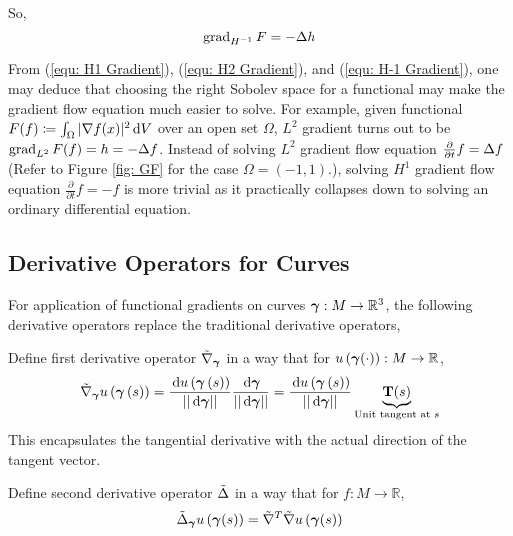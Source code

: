 \documentclass[../dissertation.tex]{subfiles}
\begin{document}
So,
\begin{equation}
    \operatorname{grad}_{H^{-1}} F = -\Delta h
    \label{equ: H-1 Gradient}
\end{equation}
\begin{remark}
    From (\ref{equ: H1 Gradient}), (\ref{equ: H2 Gradient}), and (\ref{equ: H-1 Gradient}), one may deduce that
    choosing the right Sobolev space for a functional may make the gradient flow equation much easier to solve.
    For example, given functional $F (f) \coloneqq \int_{\Omega} |\nabla f (x)|^2 \, \text{d} V$ over an open set $\Omega$,
    $L^2$ gradient turns out to be $\operatorname{grad}_{L^2} F (f) = h = -\Delta f$. 
    Instead of solving $L^2$ gradient flow equation $\frac{\partial}{\partial t} f = \Delta f$ (Refer to Figure \ref{fig: GF} for the case $\Omega = (-1, 1)$.),
    solving $H^1$ gradient flow equation $\frac{\partial}{\partial t}f = -f$ is more trivial
    as it practically collapses down to solving an ordinary differential equation.
\end{remark}

\subsection{Derivative Operators for Curves}
For application of functional gradients on curves $\boldsymbol{\gamma}: M \rightarrow \mathbb{R}^3$,
the following derivative operators replace the traditional derivative operators,
\begin{definition}
    Define first derivative operator\cite{YSC2021} $\tilde{\nabla}_{\boldsymbol{\gamma}}$ in a way that for $u \left( \boldsymbol{\gamma} (\cdot) \right): M \rightarrow \mathbb{R}$,
    \begin{equation}
        \tilde{\nabla}_{\boldsymbol{\gamma}} u \left( \boldsymbol{\gamma} \left( s \right) \right)
        = \frac{\, \text{d} u \left( \boldsymbol{\gamma} \left( s \right) \right)}{\lvert \lvert \, \text{d} \boldsymbol{\gamma} \rvert \rvert} \frac{\, \text{d} \boldsymbol{\gamma}}{\lvert \lvert \, \text{d} \boldsymbol{\gamma} \rvert \rvert}
        = \frac{\, \text{d} u \left( \boldsymbol{\gamma} \left( s \right) \right)}{\lvert \lvert \, \text{d} \boldsymbol{\gamma} \rvert \rvert} \underbrace{\mathbf{T}(s)}_{\text{Unit tangent at } s}
    \end{equation}
    This encapsulates the tangential derivative with the actual direction of the tangent vector.
\end{definition}

\begin{definition}
    Define second derivative operator $\tilde{\Delta}$ in a way that for $f: M \rightarrow \mathbb{R}$,
    \begin{equation}
        \tilde{\Delta}_{\boldsymbol{\gamma}} u \left( \boldsymbol{\gamma} (s) \right) = \tilde{\nabla}^{T} \tilde{\nabla} u \left( \boldsymbol{\gamma} (s) \right)
    \end{equation}
\end{definition}
\end{document}
